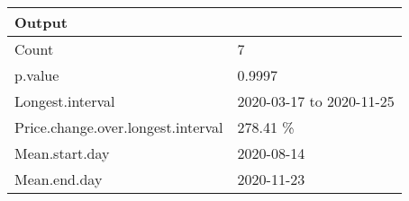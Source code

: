 \begin{table}[!tbp]
\begin{center}
\begin{tabular}{ll}
\hline\hline
\multicolumn{1}{l}{Output}&\multicolumn{1}{c}{}\tabularnewline
\hline
Count&7\tabularnewline
p.value&0.9997\tabularnewline
Longest.interval&2020-03-17 to 2020-11-25\tabularnewline
Price.change.over.longest.interval&278.41 \%\tabularnewline
Mean.start.day&2020-08-14\tabularnewline
Mean.end.day&2020-11-23\tabularnewline
\hline
\end{tabular}\end{center}
\end{table}
